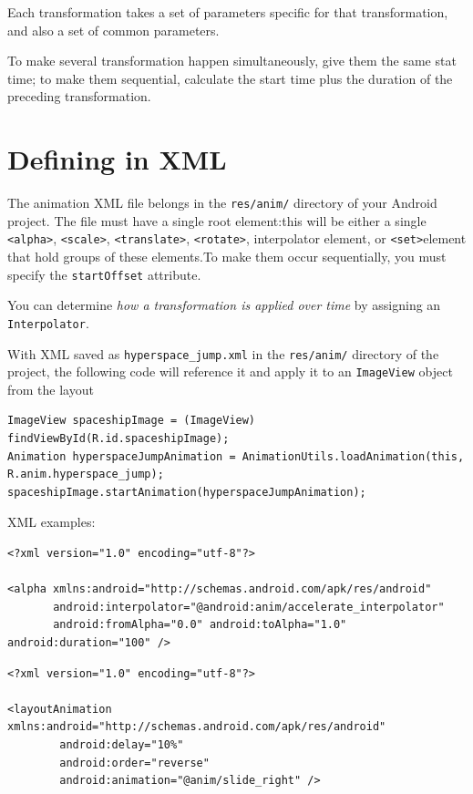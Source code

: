 \documentclass[11pt, a4paper]{book}
\begin{document}
Each transformation takes a set of parameters specific for that transformation,
and also a set of common parameters.

To make several transformation happen simultaneously, give them the same stat
time; to make them sequential, calculate the start time plus the duration of the
preceding transformation.

\section{Defining in XML}
The animation XML file belongs in the \verb|res/anim/| directory of your Android
project. The file must have a single root element:this will be either a single
\verb|<alpha>|, \verb|<scale>|, \verb|<translate>|, \verb|<rotate>|,
interpolator element, or \verb|<set>|element that hold groups of these
elements.To make them occur sequentially, you must specify the
\verb|startOffset| attribute.

You can determine \emph{how a transformation is applied over time} by assigning
an \verb|Interpolator|.

With XML saved as \verb|hyperspace_jump.xml| in the \verb|res/anim/| directory
of the project, the following code will reference it and apply it to an
\verb|ImageView| object from the layout
\begin{verbatim}
ImageView spaceshipImage = (ImageView) findViewById(R.id.spaceshipImage);
Animation hyperspaceJumpAnimation = AnimationUtils.loadAnimation(this, R.anim.hyperspace_jump);
spaceshipImage.startAnimation(hyperspaceJumpAnimation);
\end{verbatim}

XML examples:
\begin{verbatim}
<?xml version="1.0" encoding="utf-8"?>

<alpha xmlns:android="http://schemas.android.com/apk/res/android"
       android:interpolator="@android:anim/accelerate_interpolator"
       android:fromAlpha="0.0" android:toAlpha="1.0" android:duration="100" />
\end{verbatim}
\begin{verbatim}
<?xml version="1.0" encoding="utf-8"?>

<layoutAnimation xmlns:android="http://schemas.android.com/apk/res/android"
        android:delay="10%"
        android:order="reverse"
        android:animation="@anim/slide_right" />
\end{verbatim}
\end{document}
